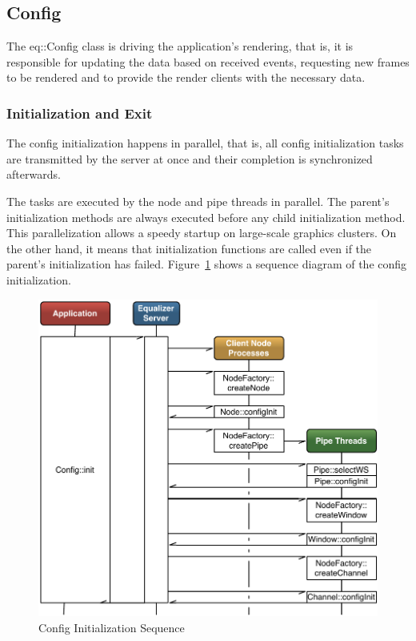 \documentclass[10pt,a4]{scrartcl}
\newcommand{\fig}[1]{Figure~\ref{#1}}
\begin{document}
\subsection{Config}

The \textsf{eq::Config} class is driving the application's rendering, that is,
it is responsible for updating the data based on received events, requesting new
frames to be rendered and to provide the render clients with the necessary data.

\subsubsection{Initialization and Exit}

The config initialization happens in parallel, that is, all config
initialization tasks are transmitted by the server at once and their
completion is synchronized afterwards. 

The tasks are executed by the node and pipe threads in parallel. The parent's
initialization methods are always executed before any child initialization
method. This parallelization allows a speedy startup on large-scale graphics
clusters. On the other hand, it means that initialization functions are called
even if the parent's initialization has failed. \fig{fConfigInit} shows a
sequence diagram of the config initialization.

\begin{figure}[ht!]\center
  \includegraphics[width=.9\textwidth]{images/configInit.pdf}
  {\caption{\label{fConfigInit}Config Initialization Sequence}}
\end{figure}
\end{document}
